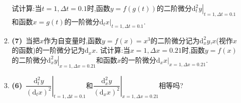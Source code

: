 \documentclass{ctexart}
\newcommand{\di}{\mathrm{d}}
\begin{document}
\begin{enumerate}[leftmargin=*,label=\textbf{\arabic*.}]
\begin{enumerate}[label=\textbf{(\arabic*)}]
                试计算:当$t=1,\Delta t=0.1$时,函数$y=f(g(t))$的二阶微分$\left.\di_t^2y\right|_{t=1,\Delta t=0.1}$和函数$x=g(t)$的一阶微分$\left.\di_tx\right|_{t=1,\Delta t=0.1}$.
            \item \textbf{(7)}\ 当把$x$作为自变量时,函数$y=f(x)=x^3$的二阶微分记为$\di_x^2y$,$x$(视作$x$的函数)的一阶微分记为$\di_xx$.
                试计算:当$x=1,\Delta x=0.21$时,函数$y=f(x)$的二阶微分$\left.\di_x^2y\right|_{x=1,\Delta x=0.21}$和函数$x$的一阶微分$\left.\di_xx\right|_{x=1,\Delta x=0.21}$.
            \item \textbf{(6)}\ $\left.\dfrac{\di_t^2y}{\left(\di_tx\right)^2}\right|_{t=1,\Delta t=0.1}$和$\left.\dfrac{\di_x^2y}{\left(\di_xx\right)^2}\right|_{x=1,\Delta x=0.21}$相等吗?
        \end{enumerate}
\end{enumerate}
\end{document}
